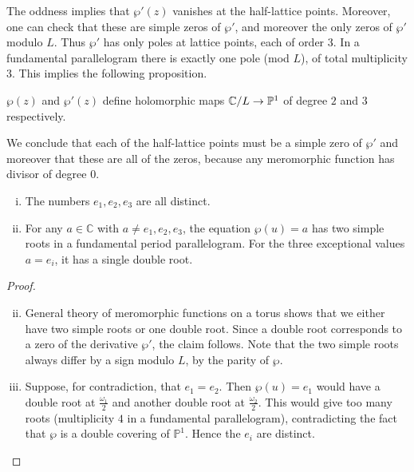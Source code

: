 \documentclass[12pt]{article}
\begin{document}
The oddness implies that $\wp'(z)$ vanishes at the half-lattice points. Moreover, one can check that these are simple zeros of $\wp'$, and moreover the only zeros of $\wp'$ modulo $L$. Thus $\wp'$ has only poles at lattice points, each of order 3. In a fundamental parallelogram there is exactly one pole (mod $L$), of total multiplicity 3. This implies the following proposition.
\begin{proposition}
    $\wp(z)$ and $\wp'(z)$ define holomorphic maps $\mathbb{C}/L \to \mathbb{P}^1$ of degree $2$ and $3$ respectively.
\end{proposition}
We conclude that each of the half-lattice points must be a simple zero of $\wp'$ and moreover that these are all of the zeros, because any meromorphic function has divisor of degree 0.

\begin{proposition}\label{prop:wp-map}
\leavevmode
\begin{enumerate}[(i)]
    \item The numbers $e_1,e_2,e_3$ are all distinct.
    \item For any $a \in \mathbb{C}$ with $a \neq e_1,e_2,e_3$, the equation $\wp(u)=a$ has two simple roots in a fundamental period parallelogram. For the three exceptional values $a=e_i$, it has a single double root.
\end{enumerate}
\end{proposition}

\begin{proof}
\leavevmode
\begin{enumerate}[(i)]
    \setcounter{enumi}{1}
    \item General theory of meromorphic functions on a torus shows that we either have two simple roots or one double root. Since a double root corresponds to a zero of the derivative $\wp'$, the claim follows. Note that the two simple roots always differ by a sign modulo $L$, by the parity of $\wp$.
    
    \setcounter{enumi}{0}
    \item Suppose, for contradiction, that $e_1=e_2$. Then $\wp(u)=e_1$ would have a double root at $\tfrac{\omega_1}{2}$ and another double root at $\tfrac{\omega_2}{2}$. This would give too many roots (multiplicity $4$ in a fundamental parallelogram), contradicting the fact that $\wp$ is a double covering of $\mathbb{P}^1$. Hence the $e_i$ are distinct.\qedhere
\end{enumerate} 
\end{proof}
\end{document}

